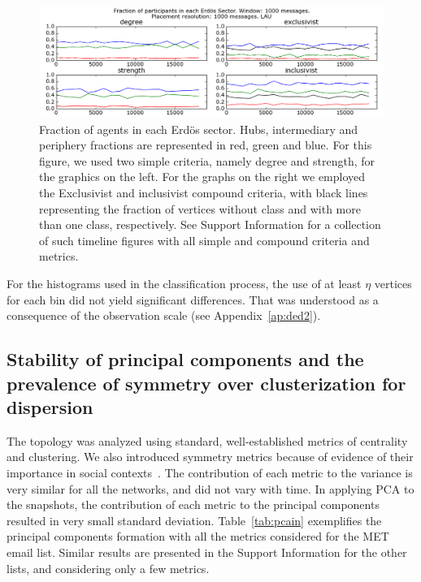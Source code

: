 \documentclass[%
 aip,
 jmp,%
 amsmath,amssymb,
 reprint,%
]{revtex4-1}
\begin{document}
\begin{figure} 
   \centering
        \includegraphics[width=\textwidth]{figs/InText-WLAU-S1000}
	\caption{Fraction of agents in each Erd\"os sector. Hubs, intermediary and periphery fractions are represented in red, green and blue. For this figure, we used two simple criteria, namely degree and strength, for the graphics on the left. For the graphs on the right we employed the Exclusivist and inclusivist compound criteria, with black lines representing the fraction of vertices without class and with more than one class, respectively. See Support Information for a collection of such timeline figures with all simple and compound criteria and metrics.}
    \label{fig:sectIL}
\end{figure}



For the histograms used in the classification process, the use of at least $\eta$ vertices for each bin did not yield significant differences.
That was understood as a consequence of the observation scale (see Appendix~\ref{ap:ded2}).


\subsection{Stability of principal components and the prevalence of symmetry over clusterization for dispersion}\label{prevalence}
The topology was analyzed using standard, well-established metrics of centrality and clustering.
We also introduced symmetry metrics because of evidence of their importance in social contexts~\cite{newmanEvolving}.
The contribution of each metric to the variance is very similar for all the networks, and did not vary with time.
In applying PCA to the snapshots, the contribution of each metric to the principal components resulted in very small standard deviation. Table~\ref{tab:pcain} exemplifies the principal components formation with all the metrics considered for the MET email list. Similar results are presented in the Support Information for the other lists, and considering only a few metrics.
\end{document}
